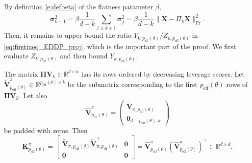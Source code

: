 \documentclass[twoside,11pt]{book}
\numberwithin{theorem}{chapter}
\numberwithin{definition}{chapter}
\numberwithin{proposition}{chapter}
\numberwithin{corollary}{chapter}
\numberwithin{example}{chapter}
\numberwithin{lemma}{chapter}
\numberwithin{assumption}{chapter}
\numberwithin{equation}{chapter}
\numberwithin{figure}{chapter}
\DeclareMathOperator{\Fr}{\mathrm{Fr}}
\DeclareMathOperator{\eff}{\mathrm{eff}}
\DeclareMathOperator{\Tran}{\intercal}
\begin{document}
By definition \eqref{e:defbeta} of the flatness parameter $\beta$,
\begin{equation}
	\label{eq:upperbound_sigmakplus1}
	\bm{\sigma}_{k+1}^{2}
	= \beta \frac{1}{d-k} \sum\limits_{j \geq k+1} \bm{\sigma}_{j}^{2}
	= \beta \frac{1}{d-k}\| \bm{X}-\Pi_k\bm{X}\|_{\Fr}^{2}.
\end{equation}
Then, it remains to upper bound the ratio $Y_{k,p_{\eff}(\theta)}/Z_{k,p_{\eff}(\theta)}$ in \eqref{eq:firstineq_EDDP_proj}, which is the important part of the proof. We first evaluate $Z_{k,p_{\eff}(\theta)}$ and then bound $Y_{k,p_{\eff}(\theta)}$.
%

The matrix $\bm{\Pi}\bm{V}_{k}\in\mathbb{R}^{d\times k}$ has its rows ordered by decreasing leverage scores. Let $\tilde{\bm{V}}^\pi_{p_{\eff}(\theta)} \in \mathbb{R}^{p_{\eff}(\theta)\times k} $ be the submatrix corresponding to the first $p_{\eff}(\theta)$ rows of $\bm{\Pi}\bm{V}_{k}$. Let also
$$\hat{\bm{V}}_{p_{\eff}(\theta)}^\pi = \begin{pmatrix}\tilde{\bm{V}}_{\pi,p_{\eff}(\theta)}\\ \bm{0}_{d-p_{\eff}(\theta),k}\end{pmatrix}$$
be padded with zeros. Then
\begin{equation}
	\bm{K}^{\pi}_{p_{\eff}(\theta)} = \left[
	\begin{array}{c|c}
		\tilde{\bm{V}}_{\pi,p_{\eff}(\theta)} \tilde{\bm{V}}_{\pi,p_{\eff}(\theta)}^{\Tran}& \bm{0} \\
		\hline
		\bm{0} & \bm{0}
	\end{array}
	\right] = \hat{\bm{V}}_{p_{\eff}(\theta)}^\pi (\hat{\bm{V}}^\pi_{p_{\eff}(\theta)})^{\Tran} \in\mathbb{R}^{d\times d}.
\end{equation}
\end{document}
